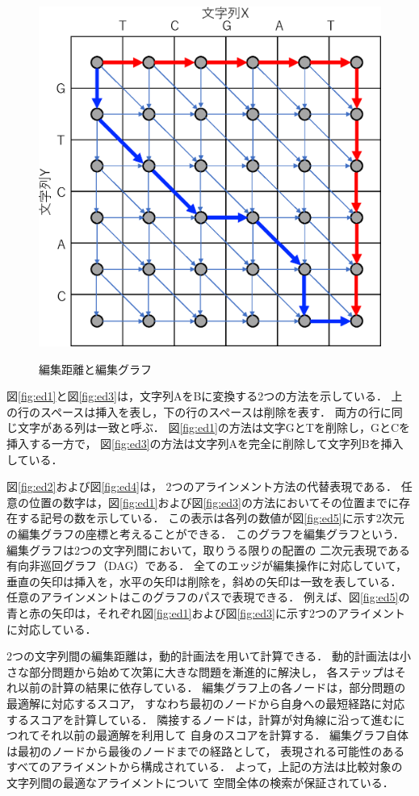 \begin{figure}[t!]
\begin{center}
{\includegraphics[keepaspectratio, scale=0.5]{fig/2/ed5.eps}
\label{fig:ed5}
 }
\caption{編集距離と編集グラフ}
\label{fig:ed}
\end{center}
\end{figure}
図\ref{fig:ed1}と図\ref{fig:ed3}は，文字列AをBに変換する2つの方法を示している．
上の行のスペースは挿入を表し，下の行のスペースは削除を表す．
両方の行に同じ文字がある列は一致と呼ぶ．
図\ref{fig:ed1}の方法は文字GとTを削除し，GとCを挿入する一方で，
図\ref{fig:ed3}の方法は文字列Aを完全に削除して文字列Bを挿入している．

図\ref{fig:ed2}および図\ref{fig:ed4}は， 2つのアラインメント方法の代替表現である．
任意の位置の数字は，図\ref{fig:ed1}および図\ref{fig:ed3}の方法においてその位置までに存
在する記号の数を示している．
この表示は各列の数値が図\ref{fig:ed5}に示す2次元の編集グラフの座標と考えることができる．
このグラフを編集グラフという．
編集グラフは2つの文字列間において，取りうる限りの配置の
二次元表現である有向非巡回グラフ（DAG）である．
全てのエッジが編集操作に対応していて，垂直の矢印は挿入を，水平の矢印は削除を，斜めの矢印は一致を表している．
任意のアラインメントはこのグラフのパスで表現できる．
例えば、図\ref{fig:ed5}の青と赤の矢印は，それぞれ図\ref{fig:ed1}および図\ref{fig:ed3}に示す2つのアライメントに対応している．

2つの文字列間の編集距離は，動的計画法を用いて計算できる．
動的計画法は小さな部分問題から始めて次第に大きな問題を漸進的に解決し，
各ステップはそれ以前の計算の結果に依存している．
編集グラフ上の各ノードは，部分問題の最適解に対応するスコア，
すなわち最初のノードから自身への最短経路に対応するスコアを計算している．
隣接するノードは，計算が対角線に沿って進むにつれてそれ以前の最適解を利用して
自身のスコアを計算する．
編集グラフ自体は最初のノードから最後のノードまでの経路として，
表現される可能性のあるすべてのアライメントから構成されている．
よって，上記の方法は比較対象の文字列間の最適なアライメントについて
空間全体の検索が保証されている．

